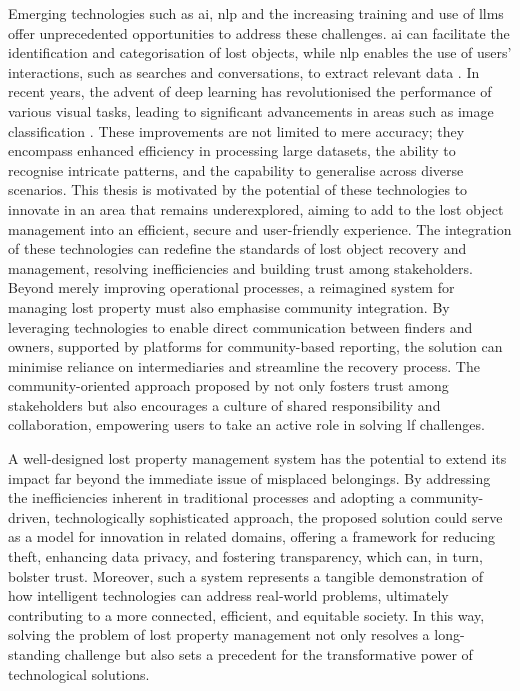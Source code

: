 Emerging technologies such as \ac{ai}, \ac{nlp} and the increasing training and use of \acp{llm} offer unprecedented opportunities to address these challenges. \ac{ai} can facilitate the identification and categorisation of lost objects, while \ac{nlp} enables the use of users' interactions, such as searches and conversations, to extract relevant data \cite{Prawira2024}. In recent years, the advent of deep learning has revolutionised the performance of various visual tasks, leading to significant advancements in areas such as image classification \cite{Liu2022}. These improvements are not limited to mere accuracy; they encompass enhanced efficiency in processing large datasets, the ability to recognise intricate patterns, and the capability to generalise across diverse scenarios. This thesis is motivated by the potential of these technologies to innovate in an area that remains underexplored, aiming to add to the lost object management into an efficient, secure and user-friendly experience. The integration of these technologies can redefine the standards of lost object recovery and management, resolving inefficiencies and building trust among stakeholders. Beyond merely improving operational processes, a reimagined system for managing lost property must also emphasise community integration. By leveraging technologies to enable direct communication between finders and owners, supported by platforms for community-based reporting, the solution can minimise reliance on intermediaries and streamline the recovery process. The community-oriented approach proposed by  not only fosters trust among stakeholders but also encourages a culture of shared responsibility and collaboration, empowering users to take an active role in solving \ac{lf} challenges.

A well-designed lost property management system has the potential to extend its impact far beyond the immediate issue of misplaced belongings. By addressing the inefficiencies inherent in traditional processes and adopting a community-driven, technologically sophisticated approach, the proposed solution could serve as a model for innovation in related domains, offering a framework for reducing theft, enhancing data privacy, and fostering transparency, which can, in turn, bolster trust. Moreover, such a system represents a tangible demonstration of how intelligent technologies can address real-world problems, ultimately contributing to a more connected, efficient, and equitable society. In this way, solving the problem of lost property management not only resolves a long-standing challenge but also sets a precedent for the transformative power of technological solutions.

